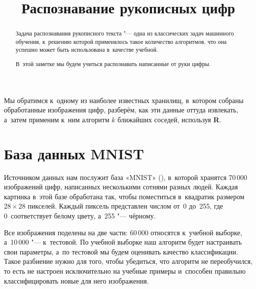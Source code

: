\documentclass[final,pdftex]{../../template/epsilonj}\usepackage[]{graphicx}\usepackage[]{color}
\begin{document}
	
	\begin{frontmatter}
		\title{Распознавание рукописных цифр}
		
		\begin{aug}
			\author{ }%
			
			
			\address{НИУ ВШЭ, Москва.}
		\end{aug}
		
		\begin{abstract}
		Задача распознавания рукописного текста "--- одна из классических задач машинного обучения, к~решению которой применялось такое количество алгоритмов, что она успешно может быть использована в~качестве учебной. 
		
		В~этой заметке мы будем учиться распознавать написанные от руки цифры.
		\end{abstract}
		
		\begin{keyword}
		\end{keyword}
		
	\end{frontmatter}
	
		
Мы обратимся к~одному из наиболее известных хранилищ, в~котором собраны обработанные изображения цифр, разберём, как эти данные оттуда извлекать, а~затем применим к~ним алгоритм $k$ ближайших соседей, используя \textbf{R}.
	
	\section{База данных MNIST}
	
Источником данных нам послужит база «MNIST» (\cite{mnistdigits}), в~которой хранятся 70\,000 изображений цифр, написанных несколькими сотнями разных людей. 
Каждая картинка в~этой базе обработана так, чтобы поместиться в~квадратик размером $28\times28$ пикселей. 
Каждый пиксель представлен числом от~0 до~255, где 0~соответствует белому цвету, а~255 "--- чёрному. 

Все изображения поделены на две части: 60\,000 относятся к~учебной выборке, а~10\,000 "--- к~тестовой. 
По учебной выборке наш алгоритм будет настраивать свои параметры, а~по тестовой мы будем оценивать качество классификации.
Такое разбиение нужно для того, чтобы убедиться, что алгоритм не переобучился, то есть не настроен исключительно на учебные примеры и~способен правильно классифицировать новые для него изображения.
\end{document}
